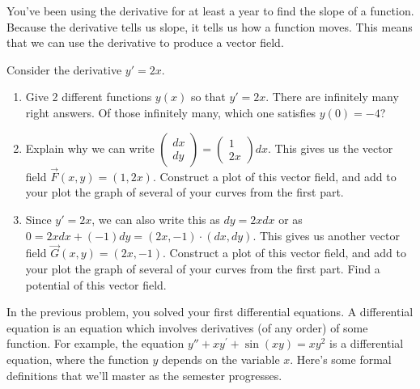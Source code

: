 You've been using the derivative for at least a year to find the slope of a function. Because the derivative tells us slope, it tells us how a function moves.  This means that we can use the derivative to produce a vector field. 

\begin{problem}
Consider the derivative $y'=2x$.  
\begin{enumerate}
 \item Give 2 different functions $y(x)$ so that $y'=2x$. There are infinitely many right answers.  Of those infinitely many, which one satisfies $y(0)=-4$?
 \item Explain why we can write 
$\begin{pmatrix}
  dx\\dy  
 \end{pmatrix}
 =
\begin{pmatrix}
  1\\2x  
 \end{pmatrix}
dx$.  This gives us the vector field $\vec F(x,y) = (1,2x)$.  Construct a plot of this vector field, and add to your plot the graph of several of your curves from the first part. 
 \item Since $y'=2x$, we can also write this as $dy = 2x dx$ or as $0=2xdx+(-1)dy = (2x,-1)\cdot (dx,dy)$. This gives us another vector field $\vec G(x,y) = (2x,-1)$.  
Construct a plot of this vector field, and add to your plot the graph of several of your curves from the first part. 
Find a potential of this vector field. 
\end{enumerate}

\end{problem}


In the previous problem, you solved your first differential equations. 
A differential equation is an equation which involves derivatives (of any order) of some function.  For example, the equation $y''+xy^\prime+\sin(xy)=xy^2$ is a differential equation, where the function $y$ depends on the variable $x$. Here's some formal definitions that we'll master as the semester progresses.


